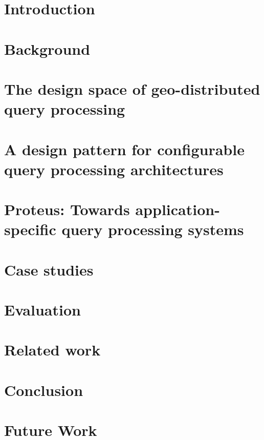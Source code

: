 \chapter{Introduction}
\label{ch:intro}


\chapter{Background}
\label{ch:background}


\chapter{The design space of geo-distributed query processing}
\label{ch:design_space}


\chapter{A design pattern for configurable query processing architectures}
\label{ch:design_pattern}


\chapter{Proteus: Towards application-specific query processing systems}
\label{ch:proteus}


\chapter{Case studies}
\label{ch:case_studies}


\chapter{Evaluation}
\label{ch:evaluation}


\chapter{Related work}
\label{ch:related_work}


\chapter{Conclusion}
\label{ch:conclusion}


\chapter{Future Work}
\label{ch:future_work}

